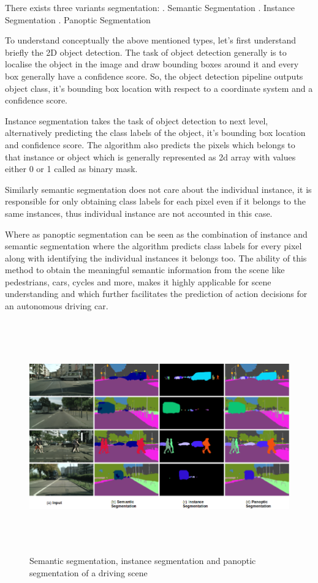      There exists three variants segmentation: . Semantic Segmentation . Instance Segmentation . Panoptic Segmentation \newline 
     
     To understand conceptually the above mentioned types, let's first understand briefly the  2D object detection. The task of object detection generally is to localise the object in the image and draw bounding boxes around it and every box generally have a confidence score. So, the object detection pipeline outputs object class, it's bounding box location with respect to a coordinate system and a confidence score. 
     
     Instance segmentation takes the task of object detection to next level, alternatively predicting the class labels of the object, it's bounding box location and confidence score. The algorithm also predicts the pixels which belongs to that instance or object which is generally represented as 2d array with values either 0 or 1 called as binary mask. 
     
     Similarly semantic segmentation does not care about the individual instance, it is responsible for only obtaining class labels for each pixel even if it belongs to the same instances, thus individual instance are not accounted in this case. 

     Where as panoptic segmentation can be seen as the combination of instance and semantic segmentation where the algorithm predicts class labels for every pixel along with identifying the individual instances it belongs too. 
    \newline
    The ability of this method to obtain the meaningful semantic information from the scene like pedestrians, cars, cycles and more, makes it highly applicable for scene understanding and which further facilitates the prediction of action decisions for an autonomous driving car.  
    
     \begin{figure}[h]
    \centering
    \includegraphics[width=\textwidth, height =10cm]{images/seg_image101.png}
    \caption{ Semantic segmentation, instance segmentation and panoptic segmentation of a driving scene \cite{8570006}}
    \end{figure}

